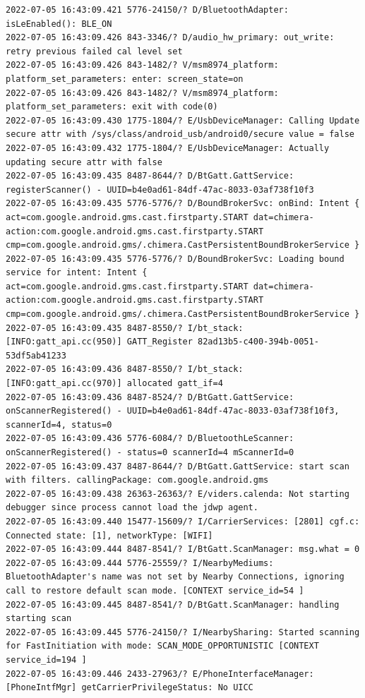 \documentclass[a4paper,12pt]{book}
\begin{document}
\begin{lstlisting}
2022-07-05 16:43:09.421 5776-24150/? D/BluetoothAdapter: isLeEnabled(): BLE_ON
2022-07-05 16:43:09.426 843-3346/? D/audio_hw_primary: out_write: retry previous failed cal level set
2022-07-05 16:43:09.426 843-1482/? V/msm8974_platform: platform_set_parameters: enter: screen_state=on
2022-07-05 16:43:09.426 843-1482/? V/msm8974_platform: platform_set_parameters: exit with code(0)
2022-07-05 16:43:09.430 1775-1804/? E/UsbDeviceManager: Calling Update secure attr with /sys/class/android_usb/android0/secure value = false
2022-07-05 16:43:09.432 1775-1804/? E/UsbDeviceManager: Actually updating secure attr with false
2022-07-05 16:43:09.435 8487-8644/? D/BtGatt.GattService: registerScanner() - UUID=b4e0ad61-84df-47ac-8033-03af738f10f3
2022-07-05 16:43:09.435 5776-5776/? D/BoundBrokerSvc: onBind: Intent { act=com.google.android.gms.cast.firstparty.START dat=chimera-action:com.google.android.gms.cast.firstparty.START cmp=com.google.android.gms/.chimera.CastPersistentBoundBrokerService }
2022-07-05 16:43:09.435 5776-5776/? D/BoundBrokerSvc: Loading bound service for intent: Intent { act=com.google.android.gms.cast.firstparty.START dat=chimera-action:com.google.android.gms.cast.firstparty.START cmp=com.google.android.gms/.chimera.CastPersistentBoundBrokerService }
2022-07-05 16:43:09.435 8487-8550/? I/bt_stack: [INFO:gatt_api.cc(950)] GATT_Register 82ad13b5-c400-394b-0051-53df5ab41233
2022-07-05 16:43:09.436 8487-8550/? I/bt_stack: [INFO:gatt_api.cc(970)] allocated gatt_if=4
2022-07-05 16:43:09.436 8487-8524/? D/BtGatt.GattService: onScannerRegistered() - UUID=b4e0ad61-84df-47ac-8033-03af738f10f3, scannerId=4, status=0
2022-07-05 16:43:09.436 5776-6084/? D/BluetoothLeScanner: onScannerRegistered() - status=0 scannerId=4 mScannerId=0
2022-07-05 16:43:09.437 8487-8644/? D/BtGatt.GattService: start scan with filters. callingPackage: com.google.android.gms
2022-07-05 16:43:09.438 26363-26363/? E/viders.calenda: Not starting debugger since process cannot load the jdwp agent.
2022-07-05 16:43:09.440 15477-15609/? I/CarrierServices: [2801] cgf.c: Connected state: [1], networkType: [WIFI]
2022-07-05 16:43:09.444 8487-8541/? I/BtGatt.ScanManager: msg.what = 0
2022-07-05 16:43:09.444 5776-25559/? I/NearbyMediums: BluetoothAdapter's name was not set by Nearby Connections, ignoring call to restore default scan mode. [CONTEXT service_id=54 ]
2022-07-05 16:43:09.445 8487-8541/? D/BtGatt.ScanManager: handling starting scan
2022-07-05 16:43:09.445 5776-24150/? I/NearbySharing: Started scanning for FastInitiation with mode: SCAN_MODE_OPPORTUNISTIC [CONTEXT service_id=194 ]
2022-07-05 16:43:09.446 2433-27963/? E/PhoneInterfaceManager: [PhoneIntfMgr] getCarrierPrivilegeStatus: No UICC

\end{lstlisting}
\end{document}
